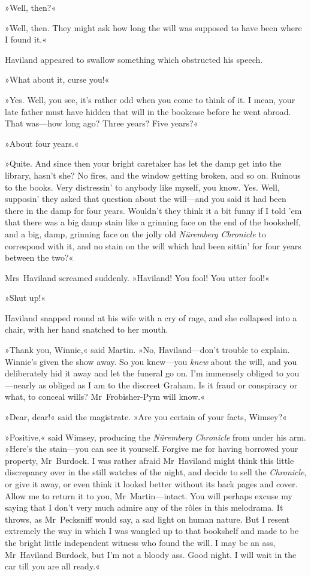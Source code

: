 »Well, then?«

»Well, then. They might ask how long the will was supposed to have been where I found it.«

Haviland appeared to swallow something which obstructed his speech.

»What about it, curse you!«

»Yes. Well, you see, it's rather odd when you come to think of it. I mean, your late father must have hidden that will in the bookcase before he went abroad. That was—how long ago? Three years? Five years?«

»About four years.«

»Quite. And since then your bright caretaker has let the damp get into the library, hasn't she? No fires, and the window getting broken, and so on. Ruinous to the books. Very distressin' to anybody like myself, you know. Yes. Well, supposin' they asked that question about the will—and you said it had been there in the damp for four years. Wouldn't they think it a bit funny if I told 'em that there was a big damp stain like a grinning face on the end of the bookshelf, and a big, damp, grinning face on the jolly old \textit{Nüremberg Chronicle} to correspond with it, and no stain on the will which had been sittin' for four years between the two?«

Mrs~Haviland screamed suddenly. »Haviland! You fool! You utter fool!«

»Shut up!«

Haviland snapped round at his wife with a cry of rage, and she collapsed into a chair, with her hand snatched to her mouth.

»Thank you, Winnie,« said Martin. »No, Haviland—don't trouble to explain. Winnie's given the show away. So you knew—you \textit{knew} about the will, and you deliberately hid it away and let the funeral go on. I'm immensely obliged to you—nearly as obliged as I am to the discreet Graham. Is it fraud or conspiracy or what, to conceal wills? Mr~Frobisher-Pym will know.«

»Dear, dear!« said the magistrate. »Are you certain of your facts, Wimsey?«

»Positive,« said Wimsey, producing the \textit{Nüremberg Chronicle} from under his arm. »Here's the stain—you can see it yourself. Forgive me for having borrowed your property, Mr~Burdock. I was rather afraid Mr~Haviland might think this little discrepancy over in the still watches of the night, and decide to sell the \textit{Chronicle}, or give it away, or even think it looked better without its back pages and cover. Allow me to return it to you, Mr~Martin—intact. You will perhaps excuse my saying that I don't very much admire any of the rôles in this melodrama. It throws, as Mr~Pecksniff would say, a sad light on human nature. But I resent extremely the way in which I was wangled up to that bookshelf and made to be the bright little independent witness who found the will. I may be an ass, Mr~Haviland Burdock, but I'm not a bloody ass. Good night. I will wait in the car till you are all ready.«

